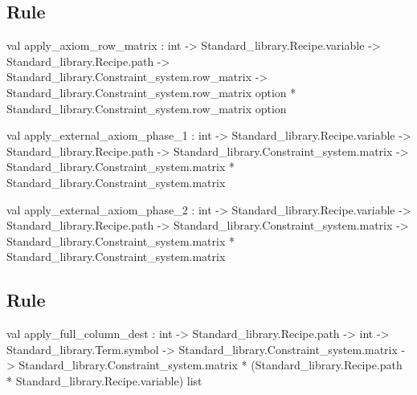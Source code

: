 \subsection{Rule \Axiom  }




\label{val:Rules.apply-underscoreaxiom-underscorerow-underscorematrix}\begin{ocamldoccode}
val apply_axiom_row_matrix :
  int ->
  Standard_library.Recipe.variable ->
  Standard_library.Recipe.path ->
  Standard_library.Constraint_system.row_matrix ->
  Standard_library.Constraint_system.row_matrix option *
  Standard_library.Constraint_system.row_matrix option
\end{ocamldoccode}




\label{val:Rules.apply-underscoreexternal-underscoreaxiom-underscorephase-underscore1}\begin{ocamldoccode}
val apply_external_axiom_phase_1 :
  int ->
  Standard_library.Recipe.variable ->
  Standard_library.Recipe.path ->
  Standard_library.Constraint_system.matrix ->
  Standard_library.Constraint_system.matrix *
  Standard_library.Constraint_system.matrix
\end{ocamldoccode}




\label{val:Rules.apply-underscoreexternal-underscoreaxiom-underscorephase-underscore2}\begin{ocamldoccode}
val apply_external_axiom_phase_2 :
  int ->
  Standard_library.Recipe.variable ->
  Standard_library.Recipe.path ->
  Standard_library.Constraint_system.matrix ->
  Standard_library.Constraint_system.matrix *
  Standard_library.Constraint_system.matrix
\end{ocamldoccode}




\subsection{Rule \Dest  }




\label{val:Rules.apply-underscorefull-underscorecolumn-underscoredest}\begin{ocamldoccode}
val apply_full_column_dest :
  int ->
  Standard_library.Recipe.path ->
  int ->
  Standard_library.Term.symbol ->
  Standard_library.Constraint_system.matrix ->
  Standard_library.Constraint_system.matrix *
  (Standard_library.Recipe.path * Standard_library.Recipe.variable) list
\end{ocamldoccode}




